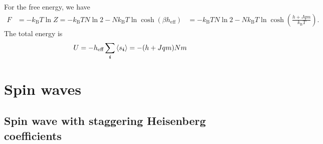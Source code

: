 \documentclass[hyperref, a4paper]{article}
\def\\{}%
\newcommand*{\kB}{k_{\text{B}}}
\begin{document}
For the free energy, we have 
\begin{equation}
    \begin{aligned}
        F &= - \kB T \ln Z = - \kB T N \ln 2 - N \kB T \ln \cosh (\beta h_{\text{eff}}) \\
        &= - \kB T N \ln 2 - N \kB T \ln \cosh (
            \frac{h + Jq m}{\kB T}
        ).
    \end{aligned}
\end{equation}
The total energy is 
\begin{equation}
    U = - h_{\text{eff}} \sum_{\vb*{i}} \expval{s_{\vb*{i}}}
     = - (h + Jqm) N m
\end{equation}

\section{Spin waves}

\subsection{Spin wave with staggering Heisenberg coefficients}
\end{document}
